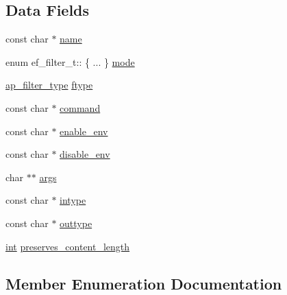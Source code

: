 \subsection*{Data Fields}
\begin{DoxyCompactItemize}
\item 
const char $\ast$ \hyperlink{structef__filter__t_a3d8059dee2d4b959f5d1fce3480484fc}{name}
\item 
enum ef\+\_\+filter\+\_\+t\+:: \{ ... \}  \hyperlink{structef__filter__t_ac7d0ba42efc7b1756f14897135659964}{mode}
\item 
\hyperlink{group__APACHE__CORE__FILTER_ga6dc4721ae075c103a3f3a93775d139fa}{ap\+\_\+filter\+\_\+type} \hyperlink{structef__filter__t_a5b21bc960b19319e9194e0a1758ee61f}{ftype}
\item 
const char $\ast$ \hyperlink{structef__filter__t_a33ed12df19ab6803de5f5263f3fcd28e}{command}
\item 
const char $\ast$ \hyperlink{structef__filter__t_a97cebb00290f47b3e78f6256bea02aa8}{enable\+\_\+env}
\item 
const char $\ast$ \hyperlink{structef__filter__t_ae8f27c72916a963a7a9efd9707aa48fb}{disable\+\_\+env}
\item 
char $\ast$$\ast$ \hyperlink{structef__filter__t_a88e5890bf5a4562d6810553a52564952}{args}
\item 
const char $\ast$ \hyperlink{structef__filter__t_a96f28a60912c4b94c04336a15cf99290}{intype}
\item 
const char $\ast$ \hyperlink{structef__filter__t_ab9703641087ddf2ed6c4290efae623be}{outtype}
\item 
\hyperlink{pcre_8txt_a42dfa4ff673c82d8efe7144098fbc198}{int} \hyperlink{structef__filter__t_a11eb1142226f16c3d4d76a339af4148b}{preserves\+\_\+content\+\_\+length}
\end{DoxyCompactItemize}


\subsection{Member Enumeration Documentation}
